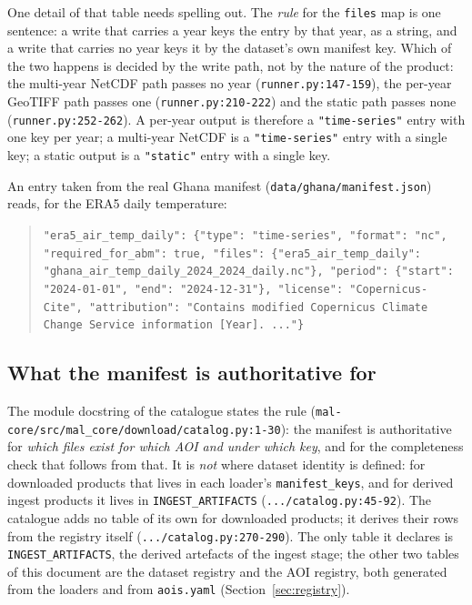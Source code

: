 \documentclass[11pt,a4paper]{article}
\newcommand{\code}[1]{\texttt{#1}}
\begin{document}
One detail of that table needs spelling out. The \emph{rule} for the \code{files} map is one sentence: a write that
carries a year keys the entry by that year, as a string, and a write that
carries no year keys it by the dataset's own manifest key. Which of the two
happens is decided by the write path, not by the nature of the product: the
multi-year NetCDF path passes no year (\code{runner.py:147-159}), the
per-year GeoTIFF path passes one (\code{runner.py:210-222}) and the static
path passes none (\code{runner.py:252-262}). A per-year output is therefore
a \code{"time-series"} entry with one key per year; a multi-year NetCDF is
a \code{"time-series"} entry with a single key; a static output is a
\code{"static"} entry with a single key.

An entry taken from the real Ghana manifest
(\code{data/ghana/manifest.json}) reads, for the ERA5 daily temperature:

\begin{quote}
\small
\code{"era5\_air\_temp\_daily": \{"type": "time-series", "format": "nc",
"required\_for\_abm": true, "files": \{"era5\_air\_temp\_daily":
"ghana\_air\_temp\_daily\_2024\_2024\_daily.nc"\}, "period": \{"start":
"2024-01-01", "end": "2024-12-31"\}, "license": "Copernicus-Cite",
"attribution": "Contains modified Copernicus Climate Change Service
information [Year]. ..."\}}
\end{quote}

\subsection{What the manifest is authoritative for}

The module docstring of the catalogue states the rule
(\code{mal-core/src/mal\_core/download/catalog.py:1-30}): the manifest is
authoritative for \emph{which files exist for which AOI and under which key},
and for the completeness check that follows from that. It is \emph{not} where
dataset identity is defined: for downloaded products that lives in each
loader's \code{manifest\_keys}, and for derived ingest products it lives in
\code{INGEST\_ARTIFACTS} (\code{.../catalog.py:45-92}). The catalogue adds
no table of its own for downloaded products; it derives their rows from the
registry itself (\code{.../catalog.py:270-290}). The only table it declares
is \code{INGEST\_ARTIFACTS}, the derived artefacts of the ingest stage; the
other two tables of this document are the dataset registry and the AOI
registry, both generated from the loaders and from \code{aois.yaml}
(Section~\ref{sec:registry}).
\end{document}
